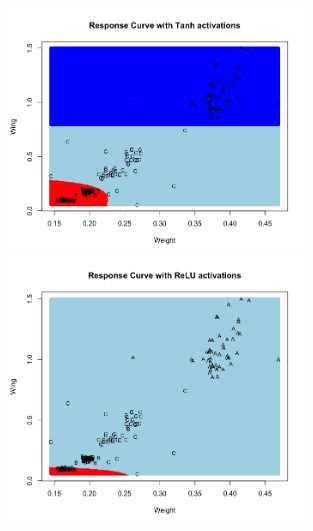 \documentclass[12pt]{article}
\begin{document}
\subsubsection{}
\begin{figure}[!ht]
\centering
\includegraphics[width=0.7\textwidth]{question_f_plot_A.png}
\includegraphics[width=0.7\textwidth]{question_f_plot_B.png}
\end{figure}
\end{document}
